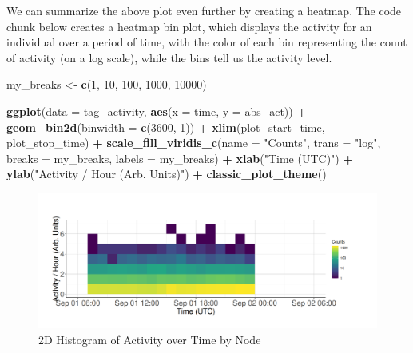 \documentclass[
]{book}
\newenvironment{Shaded}{\begin{snugshade}}{\end{snugshade}}
\newcommand{\AttributeTok}[1]{\textcolor[rgb]{0.13,0.29,0.53}{#1}}
\newcommand{\DecValTok}[1]{\textcolor[rgb]{0.00,0.00,0.81}{#1}}
\newcommand{\FunctionTok}[1]{\textcolor[rgb]{0.13,0.29,0.53}{\textbf{#1}}}
\newcommand{\NormalTok}[1]{#1}
\newcommand{\OtherTok}[1]{\textcolor[rgb]{0.56,0.35,0.01}{#1}}
\newcommand{\SpecialCharTok}[1]{\textcolor[rgb]{0.81,0.36,0.00}{\textbf{#1}}}
\newcommand{\StringTok}[1]{\textcolor[rgb]{0.31,0.60,0.02}{#1}}
\begin{document}
We can summarize the above plot even further by creating a heatmap. The code chunk below creates a heatmap bin plot, which displays the activity for an individual over a period of time, with the color of each bin representing the count of activity (on a log scale), while the bins tell us the activity level.

\begin{Shaded}
\begin{Highlighting}[]
\NormalTok{my\_breaks }\OtherTok{\textless{}{-}} \FunctionTok{c}\NormalTok{(}\DecValTok{1}\NormalTok{, }\DecValTok{10}\NormalTok{, }\DecValTok{100}\NormalTok{, }\DecValTok{1000}\NormalTok{, }\DecValTok{10000}\NormalTok{)}

\FunctionTok{ggplot}\NormalTok{(}\AttributeTok{data =}\NormalTok{ tag\_activity, }
       \FunctionTok{aes}\NormalTok{(}\AttributeTok{x =}\NormalTok{ time, }
           \AttributeTok{y =}\NormalTok{ abs\_act)) }\SpecialCharTok{+}
  \FunctionTok{geom\_bin2d}\NormalTok{(}\AttributeTok{binwidth =} \FunctionTok{c}\NormalTok{(}\DecValTok{3600}\NormalTok{, }\DecValTok{1}\NormalTok{)) }\SpecialCharTok{+}
  \FunctionTok{xlim}\NormalTok{(plot\_start\_time, }
\NormalTok{       plot\_stop\_time) }\SpecialCharTok{+}
  \FunctionTok{scale\_fill\_viridis\_c}\NormalTok{(}\AttributeTok{name =} \StringTok{"Counts"}\NormalTok{, }
                       \AttributeTok{trans =} \StringTok{"log"}\NormalTok{, }
                       \AttributeTok{breaks =}\NormalTok{ my\_breaks, }
                       \AttributeTok{labels =}\NormalTok{ my\_breaks) }\SpecialCharTok{+}
  \FunctionTok{xlab}\NormalTok{(}\StringTok{"Time (UTC)"}\NormalTok{) }\SpecialCharTok{+}
  \FunctionTok{ylab}\NormalTok{(}\StringTok{"Activity / Hour (Arb. Units)"}\NormalTok{) }\SpecialCharTok{+}  
  \FunctionTok{classic\_plot\_theme}\NormalTok{()}
\end{Highlighting}
\end{Shaded}

\begin{figure}
\centering
\includegraphics{images/presence_absence_2d_histogram_activity_vs_time.png}
\caption{2D Histogram of Activity over Time by Node}
\end{figure}
\end{document}
